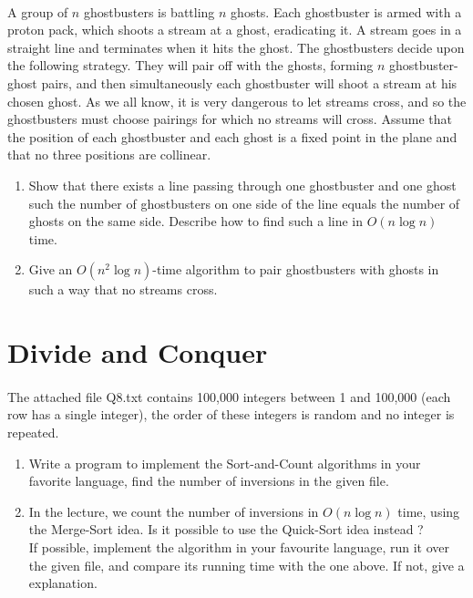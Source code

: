 \documentclass[a4paper,11pt]{article}
\begin{document}
\paragraph{}A group of $n$ ghostbusters is battling $n$ ghosts. Each ghostbuster is armed with a proton pack, which shoots a stream at a ghost, eradicating it. A stream goes in a straight line and terminates when it hits the ghost. The ghostbusters decide upon the following strategy. They will pair off with the ghosts, forming $n$ ghostbuster-ghost pairs, and then simultaneously each ghostbuster will shoot a stream at his chosen ghost. As we all know, it is very dangerous to let streams cross, and so the ghostbusters must choose pairings for which no streams will cross. Assume that the position of each ghostbuster and each ghost is a fixed point in the plane and that no three positions are collinear.

\begin{enumerate}
    \item Show that there exists a line passing through one ghostbuster and one ghost such the number of ghostbusters on one side of the line equals the number of ghosts on the same side. Describe how to find such a line in $O(n \log n)$ time.
    \item Give an $O(n^2 \log n)$-time algorithm to pair ghostbusters with ghosts in such a way that no streams cross.
\end{enumerate}

\section{Divide and Conquer}

\paragraph{}The attached file Q8.txt contains 100,000 integers between 1 and 100,000 (each row has a single integer), the order of these integers is random and no integer is repeated.
\begin{enumerate}
 \item Write a program to implement the Sort-and-Count algorithms in your favorite language, find the number of inversions in the given file.
 \item In the lecture, we count the number of inversions in $O(n \log n)$ time, using the Merge-Sort idea. Is it possible to use the Quick-Sort idea instead ? \\
If possible, implement the algorithm in your favourite language, run it over the given file, and compare its running time with the one above.
If not, give a explanation.
\end{enumerate}
\end{document}
